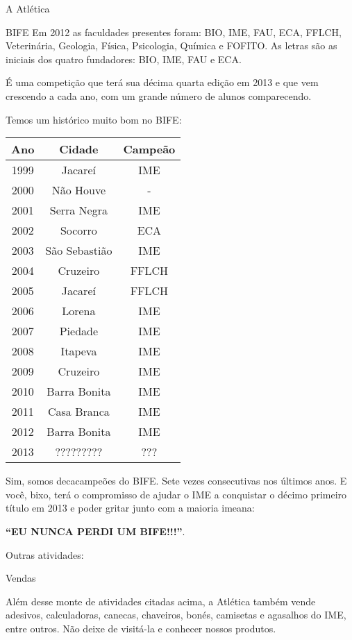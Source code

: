 \begin{secao}{A Atlética}
\begin{subsecao}{BIFE}
Em 2012 as faculdades presentes foram: BIO, IME, FAU, ECA, FFLCH, Veterinária,
Geologia, Física, Psicologia, Química e FOFITO. As letras são as iniciais
dos quatro fundadores: BIO, IME, FAU e ECA.

É uma competição que terá sua décima quarta edição em 2013 e que vem
crescendo a cada ano, com um grande número de alunos comparecendo.

Temos um histórico muito bom no BIFE:
\begin{center}
	\begin{tabular}{c|c|c}
	  Ano & Cidade & Campeão\\
	  \hline
	  1999 & Jacareí & IME\\
	  2000 & Não Houve & - \\
	  2001 & Serra Negra & IME\\
	  2002 & Socorro & ECA\\
	  2003 & São Sebastião & IME\\
	  2004 & Cruzeiro & FFLCH\\
	  2005 & Jacareí & FFLCH\\
	  2006 & Lorena & IME\\
	  2007 & Piedade & IME\\
	  2008 & Itapeva & IME\\
	  2009 & Cruzeiro & IME\\
	  2010 & Barra Bonita & IME\\
	  2011 & Casa Branca & IME\\
	  2012 & Barra Bonita & IME\\
	  2013 & ????????? & ???
	\end{tabular}
\end{center}

Sim, somos decacampeões do BIFE. Sete vezes consecutivas nos últimos anos.
E você, bixo, terá o compromisso de ajudar o IME a conquistar o décimo primeiro 
título em 2013 e poder gritar junto com a maioria imeana:

\textbf{``EU NUNCA PERDI UM BIFE!!!''}.

\end{subsecao}

Outras atividades:

\begin{subsecao}{Vendas}

Além desse monte de atividades citadas acima, a Atlética também vende
adesivos, calculadoras, canecas, chaveiros, bonés, camisetas e agasalhos do IME,
 entre outros. Não deixe de visitá-la e conhecer nossos produtos.


\end{subsecao}
\end{secao}
